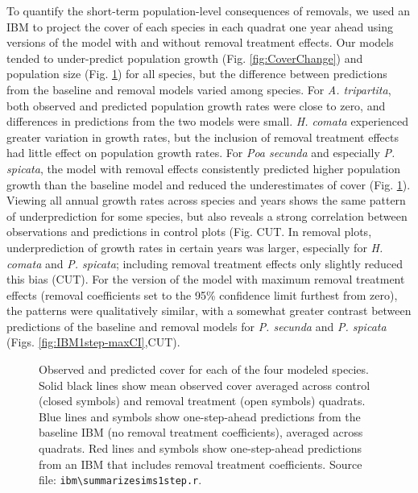 \documentclass[11pt]{article}
\begin{document}
\begin{doublespacing}
To quantify the short-term population-level consequences of removals, we used an IBM to project the cover of each species in each quadrat one year ahead using versions of the model with and without removal treatment effects. Our models tended to under-predict population growth (Fig. \ref{fig:CoverChange}) and population size (Fig. \ref{fig:IBM1step}) for all species, but the difference between predictions from the baseline and removal models varied among species. For \textit{A. tripartita}, both observed and predicted population growth rates were close to zero, and differences in predictions from the two models were small. \textit{H. comata} experienced greater variation in growth rates, but the inclusion of removal treatment effects had little effect on population growth rates. For \textit{Poa secunda} and especially \textit{P. spicata}, the model with removal effects consistently predicted higher population growth than the baseline model  and reduced the underestimates of cover (Fig. \ref{fig:IBM1step}). Viewing all annual growth rates across species and years shows the same pattern of underprediction for some species, but also reveals a strong correlation between observations and predictions in control plots (Fig. CUT. In removal plots, underprediction of growth rates in certain years was larger, especially for \textit{H. comata} and \textit{P. spicata}; including removal treatment effects only slightly reduced this bias (CUT). For the version of the model with maximum removal treatment effects (removal coefficients set to the 95\% confidence limit furthest from zero), the patterns were qualitatively similar, with a somewhat greater contrast between predictions of the baseline and removal models for \textit{P. secunda} and \textit{P. spicata} (Figs. \ref{fig:IBM1step-maxCI},CUT).

 \begin{figure}[tbp]
 \centering
 \caption{Observed and predicted cover for each of the four modeled species. Solid black lines show mean observed cover averaged across control (closed symbols) and removal treatment (open symbols) quadrats. Blue lines and symbols show one-step-ahead predictions from the baseline IBM (no removal treatment coefficients), averaged across quadrats. Red lines and symbols show one-step-ahead predictions from an IBM that includes removal treatment coefficients. Source file: \texttt{ibm\textbackslash summarize\textunderscore sims1step.r}. }
 \label{fig:IBM1step}
 \end{figure}
 


\end{doublespacing}
\end{document}
